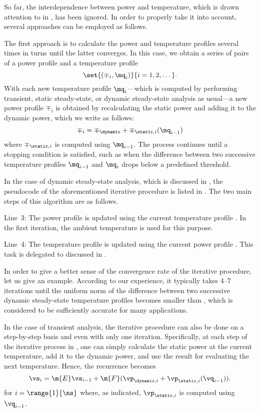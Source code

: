 So far, the interdependence between power and temperature, which is drawn
attention to in , has been ignored. In order to properly take
it into account, several approaches can be employed as follows.

The first approach is to calculate the power and temperature profiles several
times in turns until the latter converges. In this case, we obtain a series of
pairs of a power profile and a temperature profile
\[
  \set{(\mp_i, \mq_i)}{i = 1, 2, \dots}.
\]
With each new temperature profile $\mq_i$---which is computed by performing
transient, static steady-state, or dynamic steady-state analysis as usual---a
new power profile $\mp_i$ is obtained by recalculating the static power and
adding it to the dynamic power, which we write as follows:
\[
  \mp_i = \mp_\dynamic + \mp_{\static, i}(\mq_{i - 1})
\]
where $\mp_{\static, i}$ is computed using $\mq_{i - 1}$. The process continues
until a stopping condition is satisfied, such as when the difference between two
successive temperature profiles $\mq_{i - 1}$ and $\mq_i$ drops below a
predefined threshold.

In the case of dynamic steady-state analysis, which is discussed in
, the pseudocode of the aforementioned iterative
procedure is listed in . The two
main steps of this algorithm are as follows.

Line~3: The power profile \mp is updated using the current temperature profile
\mq. In the first iteration, the ambient temperature is used for this purpose.

Line~4: The temperature profile \mq is updated using the current power profile
\mp. This task is delegated to  discussed in
.

In order to give a better sense of the convergence rate of the iterative
procedure, let us give an example. According to our experience, it typically
takes 4--7 iterations until the uniform norm of the difference between two
successive dynamic steady-state temperature profiles becomes smaller than
, which is considered to be sufficiently accurate for many
applications.

In the case of transient analysis, the iterative procedure can also be done on a
step-by-step basis and even with only one iteration. Specifically, at each step
of the iterative process in , one can simply
calculate the static power at the current temperature, add it to the dynamic
power, and use the result for evaluating the next temperature. Hence, the
recurrence becomes
\[
  \vs_i = \m{E} \vs_{i - 1} + \m{F} (\vp_{\dynamic, i} + \vp_{\static, i}(\vq_{i - 1})).
\]
for $i = \range{1}{\ns}$ where, as indicated, $\vp_{\static, i}$ is computed
using $\vq_{i - 1}$.

